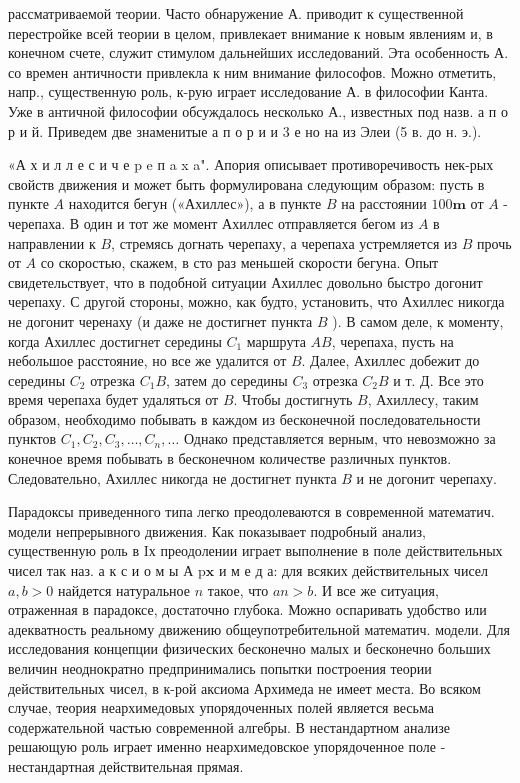 \documentclass[10pt]{article}
\begin{document}
рассматриваемой теории. Часто обнаружение А. приводит к существенной перестройке всей теории в целом, привлекает внимание к новым явлениям и, в конечном счете, служит стимулом дальнейших исследований. Эта особенность А. со времен античности привлекла к ним внимание философов. Можно отметить, напр., существенную роль, к-рую играет исследование А. в философии Канта. Уже в античной философии обсуждалось несколько А., известных под назв. а п о р и й. Приведем две знаменитые а п о р и и 3 е но на из Элеи (5 в. до н. э.).



«А х и л л е с и ч е p e п a x a". Апория описывает противоречивость нек-рых свойств движения и может быть формулирована следующим образом: пусть в пункте $A$ находится бегун («Ахиллес»), а в пункте $B$ на расстоянии $100 \boldsymbol{m}$ от $A$ - черепаха. В один и тот же момент Ахиллес отправляется бегом из $A$ в направлении к $B$, стремясь догнать черепаху, а черепаха устремляется из $B$ прочь от $A$ со скоростью, скажем, в сто раз меньшей скорости бегуна. Опыт свидетельствует, что в подобной ситуации Ахиллес довольно быстро догонит черепаху. С другой стороны, можно, как будто, установить, что Ахиллес никогда не догонит черенаху (и даже не достигнет пункта $B$ ). В самом деле, к моменту, когда Ахиллес достигнет середины $C_{1}$ маршрута $A B$, черепаха, пусть на небольшое расстояние, но все же удалится от $B$. Далее, Ахиллес добежит до середины $C_{2}$ отрезка $C_{1} B$, затем до середины $C_{3}$ отрезка $C_{2} B$ и т. Д. Все это время черепаха будет удаляться от $B$. Чтобы достигнуть $B$, Ахиллесу, таким образом, необходимо побывать в каждом из бесконечной последовательности пунктов $C_{1}, C_{2}, C_{3}, \ldots, C_{n}, \ldots$ Однако представляется верным, что невозможно за конечное время побывать в бесконечном количестве различных пунктов. Следовательно, Ахиллес никогда не достигнет пункта $B$ и не догонит черепаху.



Парадоксы приведенного типа легко преодолеваются в современной математич. модели непрерывного движения. Как показывает подробный анализ, существенную роль в Iх преодолении играет выполнение в поле действительных чисел так наз. а к с и о м ы А p$\mathbf{x}$ и м е д а: для всяких действительных чисел $a, b>0$ найдется натуральное $n$ такое, что $a n>b$. И все же ситуация, отраженная в парадоксе, достаточно глубока. Можно оспаривать удобство или адекватность реальному движению общеупотребительной математич. модели. Для исследования концепции физических бесконечно малых и бесконечно больших величин неоднократно предпринимались попытки построения теории действительных чисел, в к-рой аксиома Архимеда не имеет места. Во всяком случае, теория неархимедовых упорядоченных полей является весьма содержательной частью современной алгебры. В нестандартном анализе решающую роль играет именно неархимедовское упорядоченное поле - нестандартная действительная прямая.
\end{document}
